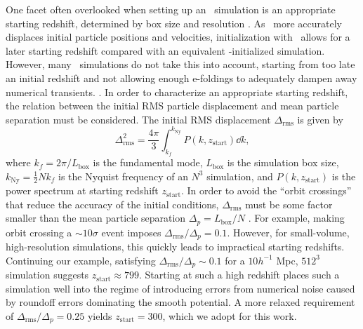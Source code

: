 One facet often overlooked when setting up an \nbody\ simulation is an appropriate starting redshift, determined by box size and resolution \citep{2007ApJ...671.1160L}.  As \lpt\ more accurately displaces initial particle positions and velocities, initialization with \lpt\ allows for a later starting redshift compared with an equivalent \za-initialized simulation.  However, many \za\ simulations do not take this into account, starting from too late an initial redshift and not allowing enough e-foldings to adequately dampen away numerical transients. \citep{2006MNRAS.373..369C, 2010MNRAS.403.1859J}.  In order to characterize an appropriate starting redshift, the relation between the initial RMS particle displacement and mean particle separation must be considered.  The initial RMS displacement $\Delta_{\mathrm{rms}}$ is given by
\begin{equation}
	\Delta_{\mathrm{rms}}^{2} = \frac{4 \pi}{3} \int_{k_{f}}^{k_{\mathrm{Ny}}} P(k, z_{\mathrm{start}}) \dd k,
\end{equation}
where $k_{f} = 2 \pi / L_{\mathrm{box}}$ is the fundamental mode, $L_{\mathrm{box}}$ is the simulation box size, $k_{\mathrm{Ny}} = \frac{1}{2} N k_{f}$ is the Nyquist frequency of an $N^{3}$ simulation, and $P(k, z_{\mathrm{start}})$ is the power spectrum at starting redshift $z_{\mathrm{start}}$.  In order to avoid the ``orbit crossings'' that reduce the accuracy of the initial conditions, $\Delta_{\mathrm{rms}}$ must be some factor smaller than the mean particle separation $\Delta_{p} = L_{\mathrm{box}} / N$ \citep{2012ApJ...761L...8H}.  For example, making orbit crossing a $\sim 10 \sigma$ event imposes $\Delta_{\mathrm{rms}} / \Delta_{p} = 0.1$.  However, for small-volume, high-resolution simulations, this quickly leads to impractical starting redshifts.  Continuing our example, satisfying $\Delta_{\mathrm{rms}} / \Delta_{p} \sim 0.1$ for a $10 h^{-1}$ Mpc, $512^{3}$ simulation suggests $z_{\mathrm{start}} \approx 799$.  Starting at such a high redshift places such a simulation well into the regime of introducing errors from numerical noise caused by roundoff errors dominating the smooth potential.  A more relaxed requirement of $\Delta_{\mathrm{rms}} / \Delta_{p} = 0.25$ yields $z_{\mathrm{start}} = 300$, which we adopt for this work.






